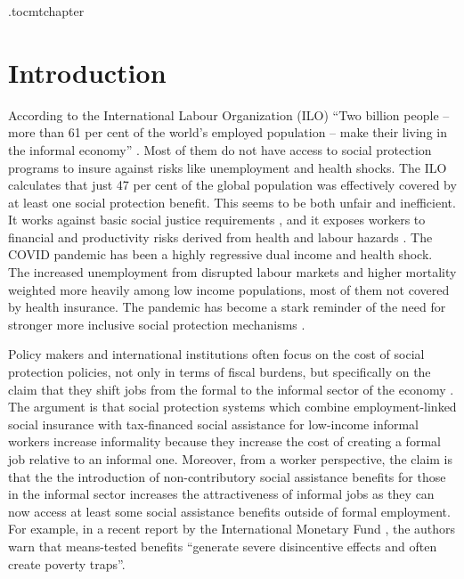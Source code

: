 \documentclass[oneside,11pt]{article}
\begin{document}
\newpage

\etocdepthtag.toc{mtchapter}



\section{Introduction}

According to the International Labour Organization (ILO) 
``Two billion people – more than 61 per cent of the world’s employed population – make their living in the informal economy'' \citep{ILO_2018}. Most of them do not have access to social protection programs to insure against risks like unemployment and health shocks. The ILO calculates that just 47 per cent of the global population was effectively covered by at least one social protection benefit. This seems to be both unfair and inefficient. It works against basic social justice requirements \citep{Dworkin}, and it exposes workers to financial and productivity risks derived from health and labour hazards \citep{FoodStamps}. The COVID pandemic has been a highly regressive dual income and health shock.  The increased unemployment from disrupted labour markets and  higher mortality weighted more heavily among low income populations, most of them not covered by health insurance.  The pandemic has become a stark reminder of the need for stronger more inclusive social protection mechanisms \citep{Arceo_Covid, COVID_gap_US}.

Policy makers and international institutions often focus on the cost of social protection policies, not only in terms of fiscal burdens, but specifically on the claim that they shift jobs from the formal to the informal sector of the economy \citep{Levy_2008,UNDP}. The argument is that social protection systems which combine employment-linked social insurance with tax-financed social assistance for low-income informal workers increase informality because they increase the cost of creating a formal job relative to an informal one. Moreover, from a worker perspective, the claim is that the the introduction of non-contributory social assistance benefits for those in the informal sector increases the attractiveness of informal jobs as they can now access at least some social assistance benefits outside of formal employment. For example, in a recent report by the International Monetary Fund \cite{IMF}, the authors warn that means-tested benefits “generate severe disincentive effects and often create poverty traps”. 
\end{document}

